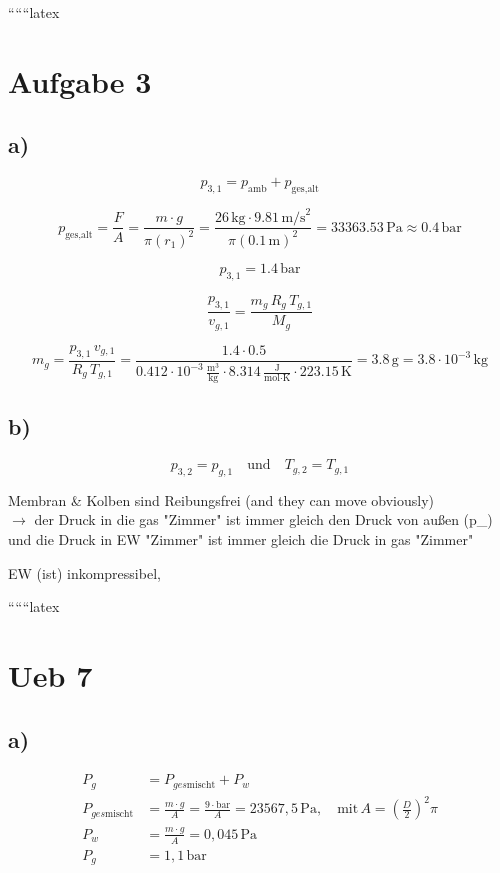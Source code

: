 
``````latex


\section*{Aufgabe 3}

\subsection*{a)}

\[
p_{3,1} = p_{\text{amb}} + p_{\text{ges,alt}}
\]

\[
p_{\text{ges,alt}} = \frac{F}{A} = \frac{m \cdot g}{\pi (r_1)^2} = \frac{26 \, \text{kg} \cdot 9.81 \, \text{m/s}^2}{\pi \left(0.1 \, \text{m}\right)^2} = 33363.53 \, \text{Pa} \approx 0.4 \, \text{bar}
\]

\[
p_{3,1} = 1.4 \, \text{bar}
\]

\[
\frac{p_{3,1}}{v_{g,1}} = \frac{m_g \, R_g \, T_{g,1}}{M_g}
\]

\[
m_g = \frac{p_{3,1} \, v_{g,1}}{R_g \, T_{g,1}} = \frac{1.4 \cdot 0.5}{0.412 \cdot 10^{-3} \, \frac{\text{m}^3}{\text{kg}} \cdot 8.314 \, \frac{\text{J}}{\text{mol} \cdot \text{K}} \cdot 223.15 \, \text{K}} = 3.8 \, \text{g} = 3.8 \cdot 10^{-3} \, \text{kg}
\]

\subsection*{b)}

\[
p_{3,2} = p_{g,1} \quad \text{und} \quad T_{g,2} = T_{g,1}
\]

Membran \& Kolben sind Reibungsfrei (and they can move obviously) \\
$\rightarrow$ der Druck in die gas "Zimmer" ist immer gleich den Druck von außen (p_{}) und die Druck in EW "Zimmer" ist immer gleich die Druck in gas "Zimmer"

EW (ist) inkompressibel,

``````latex


\section*{Ueb 7}

\subsection*{a)}
\begin{align*}
P_g &= P_{ges\text{mischt}} + P_w \\
P_{ges\text{mischt}} &= \frac{m \cdot g}{A} = \frac{9 \cdot \text{bar}}{A} = 23567,5 \, \text{Pa}, \quad \text{mit} \, A = \left( \frac{D}{2} \right)^2 \pi \\
P_w &= \frac{m \cdot g}{A} = 0,045 \, \text{Pa} \\
P_g &= 1,1 \, \text{bar}
\end{align*}

